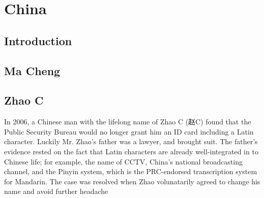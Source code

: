 \section{China}

\subsection{Introduction}

\subsection{Ma Cheng}

\subsection{Zhao C}

In 2006, a Chinese man with the lifelong name of Zhao C (赵C) found that the
Public Security Bureau would no longer grant him an ID card including a Latin
character. Luckily Mr. Zhao's father was a lawyer, and brought suit. The
father's evidence rested on the fact that Latin characters are already
well-integrated in to Chinese life; for example, the name of CCTV, China's
national broadcasting channel, and the Pinyin system, which is the PRC-endorsed
transcription system for Mandarin. The case was resolved when Zhao volunatarily
agreed to change his name and avoid further headache


